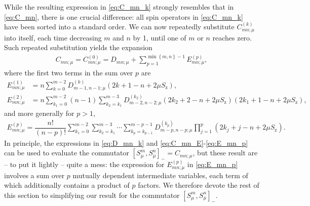 \documentclass[pra,reprint,longbibliography]{revtex4-1}
\newcommand{\f}[2]{\dfrac{#1}{#2}} %
\newcommand{\p}[1]{\left(#1\right)} %
\renewcommand{\sp}[1]{\left[#1\right]} %
\renewcommand{\set}[1]{\left\{#1\right\}} %
\newcommand{\z}{\text{z}}
\newcommand{\bmu}{{\bar\mu}}
\newcommand{\1}{\mathds{1}}
\begin{document}
While the resulting expression in \eqref{eq:C_mn_k} strongly resembles
that in \eqref{eq:C_mn}, there is one crucial difference: all spin
operators in \eqref{eq:C_mn_k} have been sorted into a standard order.
We can now repeatedly substitute $C_{mn;\mu}^{(k)}$ into itself, each
time decreasing $m$ and $n$ by 1, until one of $m$ or $n$ reaches
zero.  Such repeated substitution yields the expansion
\begin{align}
  C_{mn;\mu}
  = C_{mn;\mu}^{(0)}
  = D_{mn;\mu}
  + \sum_{p=1}^{\min\set{m,n}-1} E_{mn;\mu}^{(p)},
  \label{eq:C_mn_E}
\end{align}
where the first two terms in the sum over $p$ are
\begin{align}
  E_{mn;\mu}^{(1)}
  &= n \sum_{k=0}^{m-2} D_{m-1,n-1;\mu}^{(k)} \p{2k+1-n+2\mu S_\z}, \\
  E_{mn;\mu}^{(2)}
  &= n \sum_{k_1=0}^{m-2} \p{n-1} \sum_{k_2=k_1}^{m-3}
  D_{m-2,n-2;\mu}^{(k_2)} \p{2k_2+2-n+2\mu S_\z} \p{2k_1+1-n+2\mu S_\z},
\end{align}
and more generally for $p>1$,
\begin{align}
  E_{mn;\mu}^{(p)}
  = \f{n!}{\p{n-p}!}
  \sum_{k_1=0}^{m-2} \sum_{k_2=k_1}^{m-3} \cdots\sum_{k_p=k_{p-1}}^{m-p-1}
  D_{m-p,n-p;\mu}^{(k_p)} \prod_{j=1}^p \p{2k_j+j-n+2\mu S_\z}.
  \label{eq:E_mn_p}
\end{align}
In principle, the expressions in \eqref{eq:D_mn_k} and
\eqref{eq:C_mn_E}-\eqref{eq:E_mn_p} can be used to evaluate the
commutator $\sp{S_\mu^m,S_\bmu^n}_- = C_{mn;\mu}$, but these result
are -- to put it lightly -- quite a mess: the expression for
$E_{mn;\mu}^{(p)}$ in \eqref{eq:E_mn_p} involves a sum over $p$
mutually dependent intermediate variables, each term of which
additionally contains a product of $p$ factors.  We therefore devote
the rest of this section to simplifying our result for the commutator
$\sp{S_\mu^m,S_\bmu^n}_-$.
\end{document}
